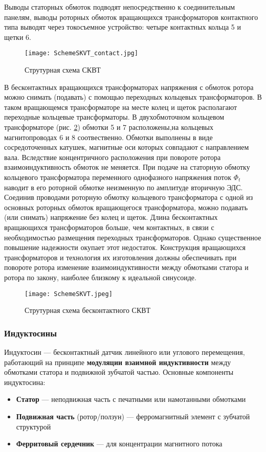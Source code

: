 Выводы статорных обмоток подводят непосредственно к соединительным панелям, выводы роторных обмоток вращающихся трансформаторов контактного типа 
выводят через токосъемное устройство: четыре контактных кольца 5 и щетки 6.

\begin{figure}[!t]
  \centering
  \texttt{[image: SchemeSKVT\_contact.jpg]}
  \caption{Струтурная схема СКВТ}
  \label{SchemeSKVT_Contact}
\end{figure}


В бесконтактных вращающихся трансформаторах напряжения с обмоток ротора можно снимать (подавать) с помощью переходных кольцевых трансформаторов.
В таком вращающемся трансформаторе на месте колец и щеток располагают переходные кольцевые трансформаторы. 
В двухобмоточном кольцевом трансформаторе (рис. \ref{SchemeSKVT}) обмотки 5 и 7 расположены,на кольцевых магнитопроводах 6 и 8 соотвественно.    
Обмотки выполнены в виде сосредоточенных катушек, магнитные оси которых совпадают с направлением вала. Вследствие концентричного расположения при повороте ротора взаимоиндуктивность 
обмоток не меняется. При подаче на статорную обмотку кольцевого трансформатора переменного однофазного напряжения поток $ \Phi_t $ наводит в его роторной обмотке неизменную по амплитуде вторичную ЭДС. 
Соединив проводами роторную обмотку кольцевого трансформатора с одной из основных роторных обмоток вращающегося трансформатора, можно подавать (или снимать) напряжение без колец и щеток. 
Длина бесконтактных вращающихся трансформаторов больше, чем контактных, в связи с необходимостью размещения переходных трансформаторов. Однако существенное повышение надежности 
окупает этот недостаток. Конструкция вращающихся трансформаторов и технология их изготовления должны обеспечивать при повороте ротора изменение взаимоиндуктивности между обмотками статора и ротора по закону, 
наиболее близкому к идеальной синусоиде.


\begin{figure}[!t]
  \centering
  \texttt{[image: SchemeSKVT.jpeg]}
  \caption{Струтурная схема бесконтактного СКВТ}
  \label{SchemeSKVT}
\end{figure}

\subsubsection{Индуктосины}

Индуктосин — бесконтактный датчик линейного или углового перемещения, работающий на принципе \textbf{модуляции взаимной индуктивности} между обмотками статора 
и подвижной зубчатой частью. 
Основные компоненты индуктосина:
\begin{itemize}
    \item \textbf{Статор} — неподвижная часть с печатными или намотанными обмотками
    \item \textbf{Подвижная часть} (ротор/ползун) — ферромагнитный элемент с зубчатой структурой
    \item \textbf{Ферритовый сердечник} — для концентрации магнитного потока
\end{itemize}


